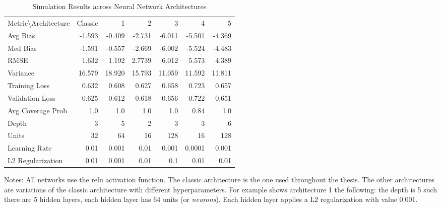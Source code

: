 \begin{table}[ht]
\centering

\begin{threeparttable}
\caption{Simulation Results across Neural Network Architectures}
\label{tab:nn}
\begin{tabular}{lrrrrrr}
    \toprule
\hline
\addlinespace
Metric\textbackslash Architecture & Classic &  1 &  2 &  3 &  4 &  5 \\
\addlinespace
\hline
\addlinespace
Avg Bias & -1.593 & -0.409 & -2.731 & -6.011 & -5.501 &-4.369 \\
Med Bias & -1.591 & -0.557 & -2.669 & -6.002 & -5.524 & -4.483\\
RMSE & 1.632 & 1.192 & 2.7739 &  6.012 &5.573 & 4.389 \\
Variance & 16.579 & 18.920 & 15.793 & 11.059 & 11.592 & 11.811 \\
Training Loss & 0.632 & 0.608 &0.627 &0.658 & 0.723 & 0.657 \\
Validation Loss & 0.625 & 0.612 &  0.618 & 0.656 & 0.722 & 0.651 \\
Avg Coverage Prob & 1.0 & 1.0 & 1.0 & 1.0 & 0.84 & 1.0 \\
\addlinespace
\hline
\addlinespace
Depth & 3 & 5 & 2 & 3 & 3 & 6 \\
Units & 32 & 64 & 16 & 128 & 16 & 128 \\
Learning Rate & 0.01 & 0.001 & 0.01 & 0.001 & 0.0001 & 0.001 \\
L2 Regularization & 0.01 & 0.001 & 0.01 & 0.1 & 0.01 & 0.01 \\
\hline
\end{tabular}
\begin{tablenotes}
    \item Notes: All networks use the \ac{relu} activation function. The classic architecture is the one used throughout the thesis. The other architectures are variations of the classic architecture with different hyperparameters. For example shows architecture 1 the following: the depth is 5 such there are 5 hidden layers, each hidden layer has 64 units (or \textit{neurons}). Each hidden layer applies a L2 regularization with value 0.001.
\end{tablenotes}
\end{threeparttable}
\end{table}
